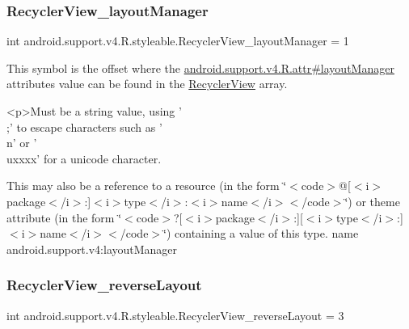 \subsubsection{\texorpdfstring{Recycler\+View\+\_\+layout\+Manager}{RecyclerView\_layoutManager}}
{\footnotesize\ttfamily int android.\+support.\+v4.\+R.\+styleable.\+Recycler\+View\+\_\+layout\+Manager = 1\hspace{0.3cm}{\ttfamily [static]}}

This symbol is the offset where the \hyperlink{classandroid_1_1support_1_1v4_1_1R_1_1attr_aab150bb5cac4951599a91c59ac183ee5}{android.\+support.\+v4.\+R.\+attr\#layout\+Manager} attribute\textquotesingle{}s value can be found in the \hyperlink{classandroid_1_1support_1_1v4_1_1R_1_1styleable_ad60a429c2c839e07a58e4212d7ffeba0}{Recycler\+View} array.

\begin{DoxyVerb}      <p>Must be a string value, using '\\;' to escape characters such as '\\n' or '\\uxxxx' for a unicode character.
\end{DoxyVerb}
 

This may also be a reference to a resource (in the form \char`\"{}$<$code$>$@\mbox{[}$<$i$>$package$<$/i$>$\+:\mbox{]}$<$i$>$type$<$/i$>$\+:$<$i$>$name$<$/i$>$$<$/code$>$\char`\"{}) or theme attribute (in the form \char`\"{}$<$code$>$?\mbox{[}$<$i$>$package$<$/i$>$\+:\mbox{]}\mbox{[}$<$i$>$type$<$/i$>$\+:\mbox{]}$<$i$>$name$<$/i$>$$<$/code$>$\char`\"{}) containing a value of this type.  name android.\+support.\+v4\+:layout\+Manager \mbox{\label{classandroid_1_1support_1_1v4_1_1R_1_1styleable_a0af7d1bacde2568fa5bbd69fe6f3261e}} 
\subsubsection{\texorpdfstring{Recycler\+View\+\_\+reverse\+Layout}{RecyclerView\_reverseLayout}}
{\footnotesize\ttfamily int android.\+support.\+v4.\+R.\+styleable.\+Recycler\+View\+\_\+reverse\+Layout = 3\hspace{0.3cm}{\ttfamily [static]}}

